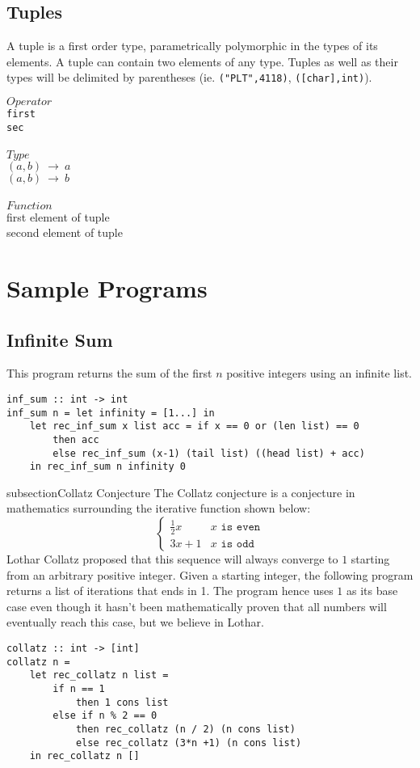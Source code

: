 \documentclass[5pt]{article}
\begin{document}
\subsection{Tuples}
A tuple is a first order type, parametrically polymorphic in the types of its 
elements. A tuple can contain two elements of any type. Tuples as well as their 
types will be delimited by parentheses (ie. \texttt{("PLT",4118)}, 
\texttt{([char],int)}).
\begin{multicols}{3}
\noindent $Operator$ \\
\hspace*{5mm} \texttt{first} \\
\hspace*{5mm} \texttt{sec} \\
\columnbreak \\
\noindent $Type$ \\
$(a,b) \ \rightarrow \  a$ \\
$(a,b) \ \rightarrow \  b$ \\
\columnbreak \\
\noindent $Function$ \\
first element of tuple \\
second element of tuple \\
\end{multicols}

\section{Sample Programs}
\subsection{Infinite Sum}
This program returns the sum of the first $n$ positive integers using an 
infinite list.
\begin{lstlisting}[language=rippl]
inf_sum :: int -> int
inf_sum n = let infinity = [1...] in
    let rec_inf_sum x list acc = if x == 0 or (len list) == 0
        then acc
        else rec_inf_sum (x-1) (tail list) ((head list) + acc)
    in rec_inf_sum n infinity 0
\end{lstlisting}
subsection{Collatz Conjecture}
The Collatz conjecture is a conjecture in mathematics surrounding the iterative 
function shown below:
$$ \begin{cases} 
      \frac{1}{2}x & x \texttt{ is even} \\
      3x + 1 & x \texttt{ is odd} 
   \end{cases}
$$
Lothar Collatz proposed that this sequence will always converge to $1$ starting 
from an arbitrary positive integer. Given a starting integer, the following 
program returns a list of iterations that ends in 1. The program hence uses $1$ 
as its base case even though it hasn't been mathematically proven that all 
numbers will eventually reach this case, but we believe in Lothar.
\begin{lstlisting}[language=rippl]
collatz :: int -> [int]
collatz n =
    let rec_collatz n list =
        if n == 1
            then 1 cons list
        else if n % 2 == 0
            then rec_collatz (n / 2) (n cons list)
            else rec_collatz (3*n +1) (n cons list)
    in rec_collatz n []
\end{lstlisting}
\end{document}
